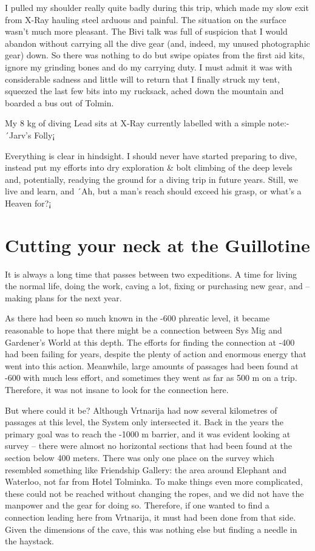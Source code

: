 I pulled my shoulder really quite badly during this trip, which made my
slow exit from X-Ray hauling steel arduous and painful. The situation on
the surface wasn't much more pleasant. The Bivi talk was full of
suspicion that I would abandon without carrying all the dive gear (and,
indeed, my unused photographic gear) down. So there was nothing to do
but swipe opiates from the first aid kits, ignore my grinding bones and
do my carrying duty. I must admit it was with considerable sadness and
little will to return that I finally struck my tent, squeezed the last
few bits into my rucksack, ached down the mountain and boarded a bus out
of Tolmin.

My 8 kg of diving Lead sits at X-Ray currently labelled with a simple
note:- ´Jarv's Folly¡

Everything is clear in hindsight. I should never have started preparing
to dive, instead put my efforts into dry exploration \& bolt climbing of
the deep levels and, potentially, readying the ground for a diving trip
in future years. Still, we live and learn, and ´Ah, but a man's reach
should exceed his grasp, or what's a Heaven for?¡


\hypertarget{cutting-your-neck-at-the-guillotine}{%
\section{Cutting your neck at the
Guillotine}\label{cutting-your-neck-at-the-guillotine}}

It is always a long time that passes between two expeditions. A time for
living the normal life, doing the work, caving a lot, fixing or
purchasing new gear, and -- making plans for the next year.

As there had been so much known in the -600 phreatic level, it became
reasonable to hope that there might be a connection between Sys Mig and
Gardener's World at this depth. The efforts for finding the connection
at -400 had been failing for years, despite the plenty of action and
enormous energy that went into this action. Meanwhile, large amounts of
passages had been found at -600 with much less effort, and sometimes
they went as far as 500 m on a trip. Therefore, it was not insane to
look for the connection here.

But where could it be? Although Vrtnarija had now several kilometres of
passages at this level, the System only intersected it. Back in the
years the primary goal was to reach the -1000 m barrier, and it was
evident looking at survey -- there were almost no horizontal sections
that had been found at the section below 400 meters. There was only one
place on the survey which resembled something like Friendship Gallery:
the area around Elephant and Waterloo, not far from Hotel Tolminka. To
make things even more complicated, these could not be reached without
changing the ropes, and we did not have the manpower and the gear for
doing so. Therefore, if one wanted to find a connection leading here
from Vrtnarija, it must had been done from that side. Given the
dimensions of the cave, this was nothing else but finding a needle in
the haystack.


